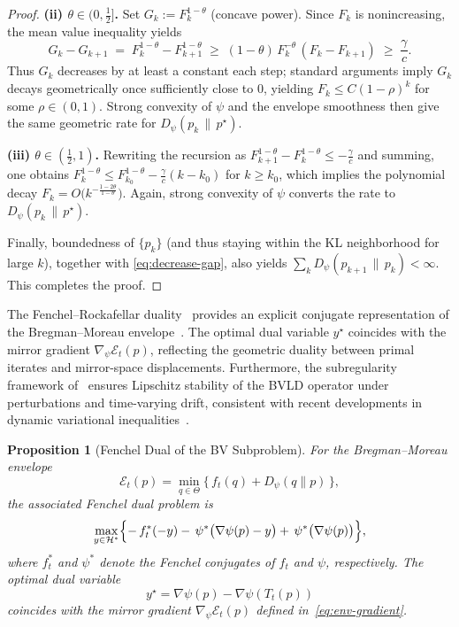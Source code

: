\documentclass[11pt]{article}
\newcommand{\Ecal}{\mathcal{E}}
\theoremstyle{plain}
\newtheorem{proposition}[theorem]{Proposition}
\theoremstyle{definition}
\theoremstyle{remark}
\begin{document}
\begin{proof}
\smallskip
\noindent\textbf{(ii) $\theta\in(0,\tfrac12]$.}
Set $G_k:=F_k^{1-\theta}$ (concave power). Since $F_k$ is nonincreasing, the mean value inequality yields
\[
G_k-G_{k+1}
\;=\;F_k^{1-\theta}-F_{k+1}^{1-\theta}
\;\ge\;(1-\theta)\,F_k^{-\theta}\,(F_k-F_{k+1})
\;\ge\;\frac{\gamma}{c}.
\]
Thus $G_k$ decreases by at least a constant each step; standard arguments imply $G_k$ decays geometrically once sufficiently close to $0$, yielding
$F_k\le C(1-\rho)^k$ for some $\rho\in(0,1)$.
Strong convexity of $\psi$ and the envelope smoothness then give the same geometric rate for $D_\psi(p_k\,\|\,p^\star)$.

\smallskip
\noindent\textbf{(iii) $\theta\in(\tfrac12,1)$.}
Rewriting the recursion as
$F_{k+1}^{1-\theta}-F_k^{1-\theta}\le -\frac{\gamma}{c}$ and summing, one obtains
$F_k^{1-\theta}\le F_{k_0}^{1-\theta}-\frac{\gamma}{c}(k-k_0)$ for $k\ge k_0$,
which implies the polynomial decay
$F_k=O\!\big(k^{-\frac{1-2\theta}{1-\theta}}\big)$.
Again, strong convexity of $\psi$ converts the rate to $D_\psi(p_k\,\|\,p^\star)$.

\smallskip
Finally, boundedness of $\{p_k\}$ (and thus staying within the KL neighborhood for large $k$),
together with \eqref{eq:decrease-gap}, also yields $\sum_k D_\psi(p_{k+1}\,\|\,p_k)<\infty$.
This completes the proof.
\end{proof}


The Fenchel–Rockafellar duality~\cite{Rockafellar1970}
provides an explicit conjugate representation of the
Bregman–Moreau envelope~\cite{Zhang2020,Li2022}.
The optimal dual variable $y^\star$ coincides with the mirror gradient
$\nabla_\psi \Ecal_t(p)$, reflecting the geometric duality between
primal iterates and mirror-space displacements.
Furthermore, the subregularity framework
of~\cite{Dontchev2014,Drusvyatskiy2018}
ensures Lipschitz stability of the BVLD operator under
perturbations and time-varying drift,
consistent with recent developments in dynamic variational
inequalities~\cite{Hsieh2023}.


\begin{proposition}[Fenchel Dual of the BV Subproblem]
\label{prop:dual}
For the Bregman--Moreau envelope
\[
\Ecal_t(p)
=\min_{q\in\Theta}\bigl\{\,f_t(q)+D_\psi(q\|p)\,\bigr\},
\]
the associated Fenchel dual problem is
\begin{equation}
\max_{y\in\mathcal H^*}
\Bigl\{
-\,f_t^*(-y)
-\,\psi^*\bigl(\nabla\psi(p)-y\bigr)
+\,\psi^*\bigl(\nabla\psi(p)\bigr)
\Bigr\},
\label{eq:dual-form}
\end{equation}
where $f_t^*$ and $\psi^*$ denote the Fenchel conjugates of $f_t$ and $\psi$, respectively.
The optimal dual variable
\[
y^\star
=\nabla\psi(p)-\nabla\psi(T_t(p))
\]
coincides with the mirror gradient 
$\nabla_\psi \Ecal_t(p)$ defined in~\eqref{eq:env-gradient}.
\end{proposition}
\end{document}
